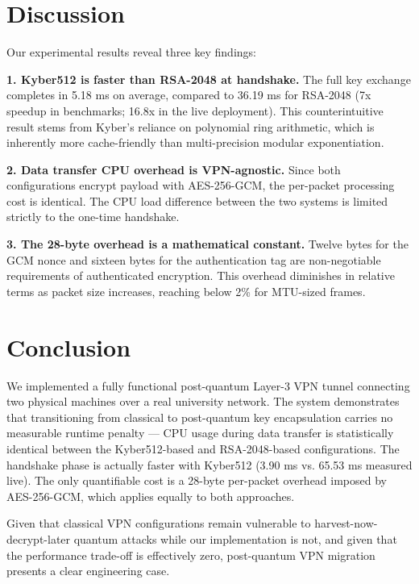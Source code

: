 \documentclass[conference,onecolumn]{IEEEtran}
\begin{document}
\section{Discussion}

Our experimental results reveal three key findings:

\textbf{1. Kyber512 is faster than RSA-2048 at handshake.} The full key exchange completes in 5.18 ms on average, compared to 36.19 ms for RSA-2048 (7x speedup in benchmarks; 16.8x in the live deployment). This counterintuitive result stems from Kyber's reliance on polynomial ring arithmetic, which is inherently more cache-friendly than multi-precision modular exponentiation.

\textbf{2. Data transfer CPU overhead is VPN-agnostic.} Since both configurations encrypt payload with AES-256-GCM, the per-packet processing cost is identical. The CPU load difference between the two systems is limited strictly to the one-time handshake.

\textbf{3. The 28-byte overhead is a mathematical constant.} Twelve bytes for the GCM nonce and sixteen bytes for the authentication tag are non-negotiable requirements of authenticated encryption. This overhead diminishes in relative terms as packet size increases, reaching below 2\% for MTU-sized frames.

\section{Conclusion}

We implemented a fully functional post-quantum Layer-3 VPN tunnel connecting two physical machines over a real university network. The system demonstrates that transitioning from classical to post-quantum key encapsulation carries no measurable runtime penalty — CPU usage during data transfer is statistically identical between the Kyber512-based and RSA-2048-based configurations. The handshake phase is actually faster with Kyber512 (3.90 ms vs. 65.53 ms measured live). The only quantifiable cost is a 28-byte per-packet overhead imposed by AES-256-GCM, which applies equally to both approaches.

Given that classical VPN configurations remain vulnerable to harvest-now-decrypt-later quantum attacks while our implementation is not, and given that the performance trade-off is effectively zero, post-quantum VPN migration presents a clear engineering case.
\end{document}
